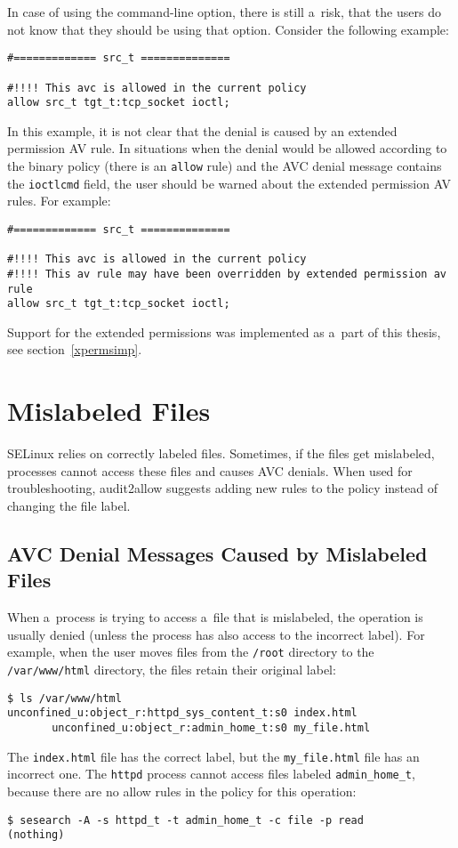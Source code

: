 In case of using the command-line option, there is still a~risk, that the users
do not know that they should be using that option. Consider the following
example:
\begin{lstlisting}
#============= src_t ==============

#!!!! This avc is allowed in the current policy
allow src_t tgt_t:tcp_socket ioctl;
\end{lstlisting}
In this example, it is not clear that the denial is caused by an extended
permission AV rule. In situations when the denial would be allowed according to
the binary policy (there is an \texttt{allow} rule) and the AVC denial message
contains the \texttt{ioctlcmd} field, the user should be warned about the
extended permission AV rules. For example:
\begin{lstlisting}
#============= src_t ==============

#!!!! This avc is allowed in the current policy
#!!!! This av rule may have been overridden by extended permission av rule
allow src_t tgt_t:tcp_socket ioctl;
\end{lstlisting}
Support for the extended permissions was implemented as a~part of this thesis,
see section~\ref{xpermsimp}.

\section{Mislabeled Files}
\label{mislabeled}
SELinux relies on correctly labeled files. Sometimes, if the files get
mislabeled, processes cannot access these files and causes AVC denials. When
used for troubleshooting, audit2allow suggests adding new rules to the policy
instead of changing the file label.

\subsection{AVC Denial Messages Caused by Mislabeled Files}
When a~process is trying to access a~file that is mislabeled, the operation is
usually denied (unless the process has also access to the incorrect label). For
example, when the user moves files from the \texttt{/root} directory to the
\texttt{/var/www/html} directory, the files retain their original label:
\begin{lstlisting}
$ ls /var/www/html
unconfined_u:object_r:httpd_sys_content_t:s0 index.html
       unconfined_u:object_r:admin_home_t:s0 my_file.html
\end{lstlisting}
The \texttt{index.html} file has the correct label, but the
\texttt{my\_file.html} file has an incorrect one. The \texttt{httpd} process
cannot access files labeled \texttt{admin\_home\_t}, because there are no allow
rules in the policy for this operation:
\begin{lstlisting}
$ sesearch -A -s httpd_t -t admin_home_t -c file -p read
(nothing)
\end{lstlisting}

